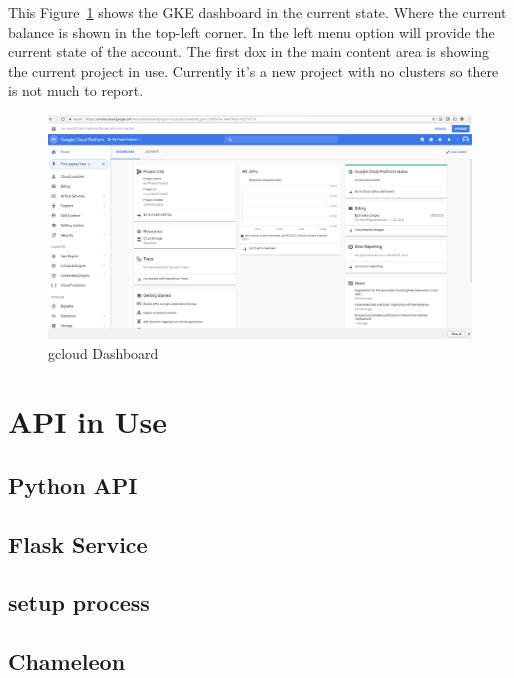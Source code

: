 This Figure~\ref{fig:gcloud-dashboard} shows the GKE dashboard in the current 
state. Where the current 
balance is shown in the top-left corner. In the left menu option will provide 
the current state of the account. The first dox in the main content area is 
showing the current project in use. Currently it’s a new project with no
 clusters so there is not much to report.
 
 \begin{figure}[htb]
   \centering\includegraphics[width=\columnwidth]
         {images/hid_417_gcloud_browser.png}
   \caption{gcloud Dashboard}\label{fig:gcloud-dashboard}
 \end{figure}

 \section{API in Use}
\subsection{Python API}

\subsection{Flask Service}

\subsection{setup process}

\subsection{Chameleon}

